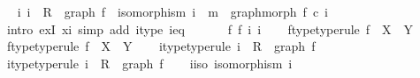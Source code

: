 \begin{isabellebody}
\ \isamarkupfalse%
\ {\isachardoublequoteopen}{\isasymexists}i{\isachardot}{\kern0pt}\ i\ {\isacharcolon}{\kern0pt}\ R\ {\isasymrightarrow}\ graph\ f\ {\isasymand}\ isomorphism\ i\ {\isasymand}\ m\ {\isacharequal}{\kern0pt}\ graph{\isacharunderscore}{\kern0pt}morph\ f\ {\isasymcirc}\isactrlsub c\ i{\isachardoublequoteclose}\isanewline
\ \ \ \ \ \ \isamarkupfalse%
\ {\isacharparenleft}{\kern0pt}intro\ exI{\isacharbrackleft}{\kern0pt}\ x{\isacharequal}{\kern0pt}i{\isacharbrackright}{\kern0pt}{\isacharcomma}{\kern0pt}\ simp\ add{\isacharcolon}{\kern0pt}\ i{\isacharunderscore}{\kern0pt}type\ i{\isacharunderscore}{\kern0pt}eq{\isacharparenright}{\kern0pt}\isanewline
\ \ \isamarkupfalse%
\isanewline
{}\isamarkupfalse%
\isanewline
\ \ \isamarkupfalse%
\ f{}\ f{}\ i{}\ i{}\isanewline
\ \ \isamarkupfalse%
\ f{}{\isacharunderscore}{\kern0pt}type{\isacharbrackleft}{\kern0pt}type{\isacharunderscore}{\kern0pt}rule{\isacharbrackright}{\kern0pt}{\isacharcolon}{\kern0pt}\ {\isachardoublequoteopen}f{}\ {\isacharcolon}{\kern0pt}\ X\ {\isasymrightarrow}\ Y{\isachardoublequoteclose}\isanewline
\ \ \isamarkupfalse%
\ f{}{\isacharunderscore}{\kern0pt}type{\isacharbrackleft}{\kern0pt}type{\isacharunderscore}{\kern0pt}rule{\isacharbrackright}{\kern0pt}{\isacharcolon}{\kern0pt}\ {\isachardoublequoteopen}f{}\ {\isacharcolon}{\kern0pt}\ X\ {\isasymrightarrow}\ Y{\isachardoublequoteclose}\isanewline
\ \ \isamarkupfalse%
\ i{}{\isacharunderscore}{\kern0pt}type{\isacharbrackleft}{\kern0pt}type{\isacharunderscore}{\kern0pt}rule{\isacharbrackright}{\kern0pt}{\isacharcolon}{\kern0pt}\ {\isachardoublequoteopen}i{}\ {\isacharcolon}{\kern0pt}\ R\ {\isasymrightarrow}\ graph\ f{}{\isachardoublequoteclose}\isanewline
\ \ \isamarkupfalse%
\ i{}{\isacharunderscore}{\kern0pt}type{\isacharbrackleft}{\kern0pt}type{\isacharunderscore}{\kern0pt}rule{\isacharbrackright}{\kern0pt}{\isacharcolon}{\kern0pt}\ {\isachardoublequoteopen}i{}\ {\isacharcolon}{\kern0pt}\ R\ {\isasymrightarrow}\ graph\ f{}{\isachardoublequoteclose}\isanewline
\ \ \isamarkupfalse%
\ i{}{\isacharunderscore}{\kern0pt}iso{\isacharcolon}{\kern0pt}\ {\isachardoublequoteopen}isomorphism\ i{}{\isachardoublequoteclose}\isanewline
\ \ \isamarkupfalse%

\end{isabellebody}
